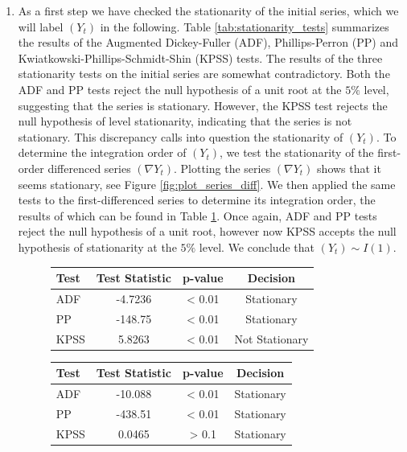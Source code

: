 \documentclass[12pt]{article}
\begin{document}
\begin{enumerate}
        \item As a first step we have checked the stationarity of the initial series, which we will label $(Y_t)$ in the following. Table \ref{tab:stationarity_tests} summarizes the results of the Augmented Dickey-Fuller (ADF), Phillips-Perron (PP) and Kwiatkowski-Phillips-Schmidt-Shin (KPSS) tests. The results of the three stationarity tests on the initial series are somewhat contradictory. Both the ADF and PP tests reject the null hypothesis of a unit root at the $5 \%$ level, suggesting that the series is stationary. However, the KPSS test rejects the null hypothesis of level stationarity, indicating that the series is not stationary. This discrepancy calls into question the stationarity of $(Y_t)$. To determine the integration order of $(Y_t)$, we test the stationarity of the first-order differenced series $(\nabla Y_t)$. Plotting the series $(\nabla Y_t)$ shows that it seems stationary, see Figure \ref{fig:plot_series_diff}. We then applied the same tests to the first-differenced series to determine its integration order, the results of which can be found in Table \ref{tab:stationarity_tests_diff}. Once again, ADF and PP tests reject the null hypothesis of a unit root, however now KPSS accepts the null hypothesis of stationarity at the $5 \%$ level. We conclude that $(Y_t) \sim I(1)$.
        \begin{figure}[ht]
            \centering
            \begin{minipage}{0.48\linewidth}
                \centering
                \begin{tabular}{l|ccc}
                    \textbf{Test} & \textbf{Test Statistic} & \textbf{p-value} & \textbf{Decision} \\
                    \hline
                    ADF  & -4.7236 & < 0.01 & Stationary \\
                    PP   & -148.75 & < 0.01 & Stationary \\
                    KPSS & 5.8263  & < 0.01 & Not Stationary
                \end{tabular}
                \label{tab:stationarity_tests}
            \end{minipage}
            \hfill
            \begin{minipage}{0.48\linewidth}
                \centering
                \begin{tabular}{l|ccc}
                    \textbf{Test} & \textbf{Test Statistic} & \textbf{p-value} & \textbf{Decision} \\
                    \hline
                    ADF  & -10.088  & < 0.01 & Stationary \\
                    PP   & -438.51  & < 0.01 & Stationary \\
                    KPSS & 0.0465   & > 0.1  & Stationary
                \end{tabular}
                \label{tab:stationarity_tests_diff}
            \end{minipage}
        \end{figure}


\end{enumerate}
\end{document}
